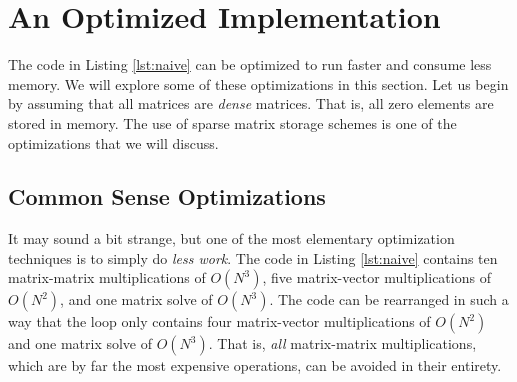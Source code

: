 \section{An Optimized Implementation}

The code in Listing \ref{lst:naive} can be optimized to run faster and consume less memory. We will explore some of these optimizations in this section. Let us begin by assuming that all matrices are \emph{dense} matrices. That is, all zero elements are stored in memory. The use of sparse matrix storage schemes is one of the optimizations that we will discuss.

\subsection{Common Sense Optimizations}

It may sound a bit strange, but one of the most elementary optimization techniques is to simply do \emph{less work}. The code in Listing \ref{lst:naive} contains ten matrix-matrix multiplications of $O(N^3)$, five matrix-vector multiplications of $O(N^2)$, and one matrix solve of $O(N^3)$. The code can be rearranged in such a way that the loop only contains four matrix-vector multiplications of $O(N^2)$ and one matrix solve of $O(N^3)$. That is, \emph{all} matrix-matrix multiplications, which are by far the most expensive operations, can be avoided in their entirety. 

